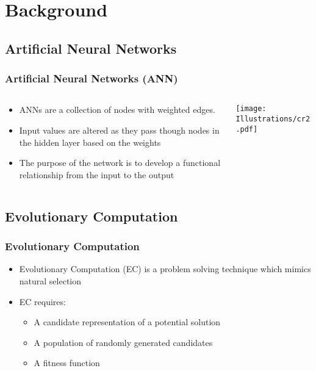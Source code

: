\documentclass{beamer}
\begin{document}
\section{Background}

\subsection{Artificial Neural Networks}
\begin{frame}
  \frametitle{Artificial Neural Networks (ANN)}
\begin{columns}
  \begin{column}{0.5\textwidth}
\begin{itemize}
\item ANNs are a collection of nodes with weighted edges.
\item Input values are altered as they pass though nodes in the hidden layer based on the weights
\item The purpose of the network is to develop a functional relationship from the input to the output
\end{itemize}
\end{column}
\begin{column}{0.5\textwidth}
 \texttt{[image: Illustrations/cr2.pdf]}
       \\
\end{column}
\end{columns}
\end{frame}

	\subsection{Evolutionary Computation}
\begin{frame}
\frametitle{Evolutionary Computation}
 \begin{itemize}
\item Evolutionary Computation (EC) is a problem solving technique which mimics natural selection
\item EC requires:
\begin{itemize}
  \item A candidate representation of a potential solution
  \item A population of randomly generated candidates
  \item A fitness function
\end{itemize}
  \end{itemize}
\end{frame}
\end{document}
